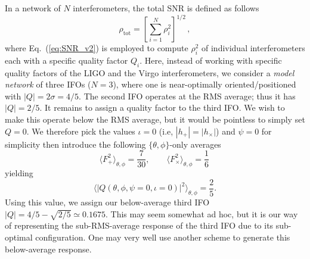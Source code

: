 \documentclass[prd,amsmath,amssymb,aps,floats,amsfonts,notitlepage,superscriptaddress,eqsecnum,nofootinbib,10pt]{revtex4-1}
\newcommand{\f}{\frac}
\newcommand{\be}{\begin{equation}}
\newcommand{\ee}{\end{equation}}
\begin{document}
In a network of $N$ interferometers, the total SNR is defined as follows \cite{Finn:2000hj}
%
\be
\rho_\text{tot} = \left[{\sum_{i=1}^N \rho^2_i}\right]^{1/2}\, , \label{eq:SNR_total}
\ee
%
where Eq.~(\ref{eq:SNR_v2}) is employed to compute $\rho^2_i$ of individual interferometers each with a specific quality factor $Q_i$.
Here, instead of working with specific quality factors of the LIGO and the Virgo interferometers, we consider
a \emph{model network} of three IFOs ($N=3$), where one is near-optimally oriented/positioned with $|Q|=2\sigma=4/5$.
The second IFO operates at the RMS average; thus it has $|Q|=2/5$. %
It remains to assign a quality factor to the third IFO. We wish to make this operate below the RMS average, %
but it would be pointless to simply set $Q=0$. We therefore pick the values $\iota=0$ (i.e, $|h_+|=|h_\times|$)
and $\psi=0$ for simplicity %
then introduce the following $\{\theta,\phi\}$-only averages
%
\be
 \langle F_+^2\rangle_{\theta,\phi} = \frac{7}{30},\qquad \langle F_\times^2\rangle_{\theta,\phi} = \frac{1}{6}\, 
\ee
yielding
%
\be
\langle |Q(\theta,\phi,\psi=0,\iota=0)|^2 \rangle_{\theta,\phi} = \f{2}{5} \label{eq:RMS_th_phi}.
\ee
Using this value, we assign our below-average third IFO %
$|Q|=4/5-\sqrt{2/5}\simeq 0.1675$.
This may seem somewhat ad hoc, 
but it is our way of representing the sub-RMS-average response of the third IFO due to its sub-optimal configuration. 
One may very well use another scheme to generate this below-average response.
\end{document}
